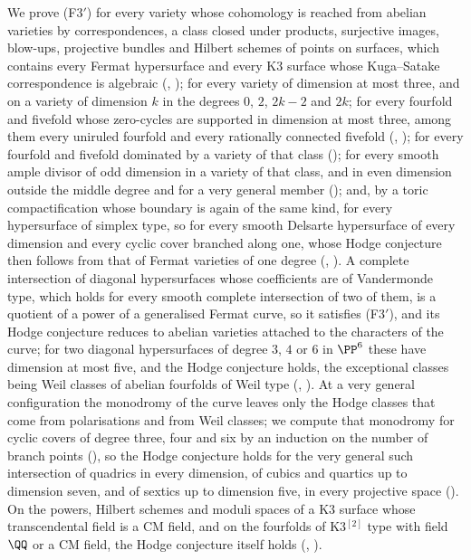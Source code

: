 We prove (F3$'$) for every variety whose cohomology is reached from abelian
varieties by correspondences, a class closed under products, surjective
images, blow-ups, projective bundles and Hilbert schemes of points on
surfaces, which contains every Fermat hypersurface and every K3 surface whose
Kuga--Satake correspondence is algebraic (,
); for every variety of dimension at most three, and on
a variety of dimension $k$ in the degrees $0$, $2$, $2k-2$ and $2k$; for
every fourfold and fivefold whose zero-cycles are supported in dimension at
most three, among them every uniruled fourfold and every rationally connected
fivefold (, ); for every
fourfold and fivefold dominated by a variety of that class
(); for every smooth ample divisor of odd
dimension in a variety of that class, and in even dimension outside the
middle degree and for a very general member ();
and, by a toric compactification whose boundary is again of the same kind, for
every hypersurface of simplex type, so for every smooth Delsarte hypersurface
of every dimension and every cyclic cover branched along one, whose Hodge
conjecture then follows from that of Fermat varieties of one degree
(, ). A complete intersection
of diagonal hypersurfaces whose coefficients are of Vandermonde type, which
holds for every smooth complete intersection of two of them, is a quotient
of a power of a generalised Fermat curve, so it satisfies (F3$'$), and its
Hodge conjecture reduces to abelian varieties attached to the characters of
the curve; for two diagonal hypersurfaces of degree $3$, $4$ or $6$ in
$\PP^{6}$ these have dimension at most five, and the Hodge conjecture holds,
the exceptional classes being Weil classes of abelian fourfolds of Weil type
(, ). At a very general
configuration the monodromy of the curve leaves only the Hodge classes that
come from polarisations and from Weil classes; we compute that monodromy for
cyclic covers of degree three, four and six by an induction on the number of
branch points (), so the Hodge conjecture holds
for the very general such intersection of quadrics in every dimension, of
cubics and quartics up to dimension seven, and of sextics up to dimension
five, in every projective space (). On the powers, Hilbert
schemes and moduli spaces of a K3 surface whose transcendental field is a CM
field, and on the fourfolds of K3$^{[2]}$ type with field $\QQ$ or a CM
field, the Hodge conjecture itself holds (,
).


